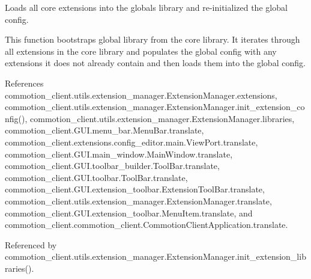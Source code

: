 \begin{DoxyVerb}Loads all core extensions into the globals library and re-initialized the global config.

This function bootstraps global library from the core library. It iterates through all extensions in the core library and populates the global config with any extensions it does not already contain and then loads them into the global config.\end{DoxyVerb}
 

References commotion\+\_\+client.\+utils.\+extension\+\_\+manager.\+Extension\+Manager.\+extensions, commotion\+\_\+client.\+utils.\+extension\+\_\+manager.\+Extension\+Manager.\+init\+\_\+extension\+\_\+config(), commotion\+\_\+client.\+utils.\+extension\+\_\+manager.\+Extension\+Manager.\+libraries, commotion\+\_\+client.\+G\+U\+I.\+menu\+\_\+bar.\+Menu\+Bar.\+translate, commotion\+\_\+client.\+extensions.\+config\+\_\+editor.\+main.\+View\+Port.\+translate, commotion\+\_\+client.\+G\+U\+I.\+main\+\_\+window.\+Main\+Window.\+translate, commotion\+\_\+client.\+G\+U\+I.\+toolbar\+\_\+builder.\+Tool\+Bar.\+translate, commotion\+\_\+client.\+G\+U\+I.\+toolbar.\+Tool\+Bar.\+translate, commotion\+\_\+client.\+G\+U\+I.\+extension\+\_\+toolbar.\+Extension\+Tool\+Bar.\+translate, commotion\+\_\+client.\+utils.\+extension\+\_\+manager.\+Extension\+Manager.\+translate, commotion\+\_\+client.\+G\+U\+I.\+extension\+\_\+toolbar.\+Menu\+Item.\+translate, and commotion\+\_\+client.\+commotion\+\_\+client.\+Commotion\+Client\+Application.\+translate.



Referenced by commotion\+\_\+client.\+utils.\+extension\+\_\+manager.\+Extension\+Manager.\+init\+\_\+extension\+\_\+libraries().


